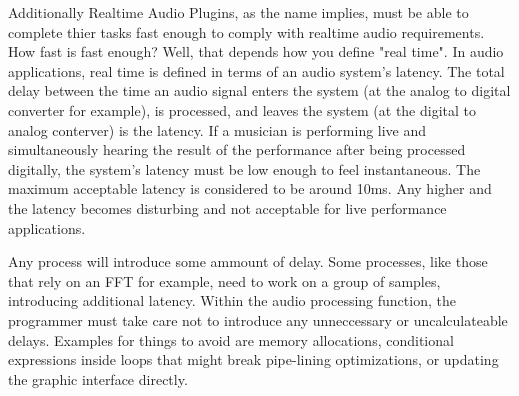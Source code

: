 Additionally Realtime Audio Plugins, as the name implies, must be able to complete thier tasks fast enough to comply with realtime audio requirements. How fast is fast enough? Well, that depends how you define "real time". In audio applications, real time is defined in terms of an audio system's latency. The total delay between the time an audio signal enters the system (at the analog to digital converter for example), is processed, and leaves the system (at the digital to analog conterver) is the latency. If a musician is performing live and simultaneously hearing the result of the performance after being processed digitally, the system's latency must be low enough to feel instantaneous. The maximum acceptable latency is considered to be around 10ms\cite{AES67-2013}. Any higher and the latency becomes disturbing and not acceptable for live performance applications.

Any process will introduce some ammount of delay. Some processes, like those that rely on an FFT for example, need to work on a group of samples, introducing additional latency. Within the audio processing function, the programmer must take care not to introduce any unneccessary or uncalculateable delays. Examples for things to avoid are memory allocations, conditional expressions inside loops that might break pipe-lining optimizations\cite{realtime-architectures}, or updating the graphic interface directly.

